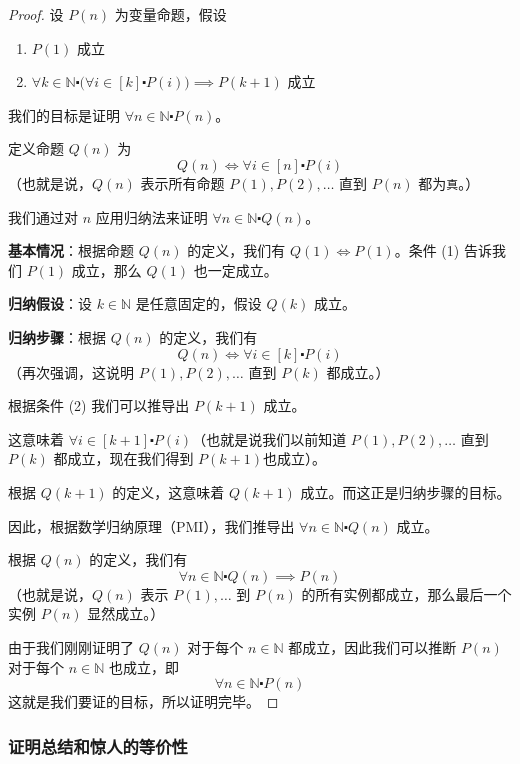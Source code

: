 \begin{proof}
    设 $P(n)$ 为变量命题，假设
    \begin{enumerate}[label=(\arabic*)]
        \item $P(1)$ 成立
        \item $\forall k \in \mathbb{N} \centerdot \big(\forall i \in [k] \centerdot P(i)\big) \implies P(k+1)$ 成立
    \end{enumerate}
    我们的目标是证明 $\forall n \in \mathbb{N} \centerdot P(n)$。

    定义命题 $Q(n)$ 为
    \[Q(n) \iff \forall i \in [n] \centerdot P(i)\]
    （也就是说，$Q(n)$ 表示所有命题 $P(1), P(2), \dots$ 直到 $P(n)$ 都为\verb|真|。）

    我们通过对 $n$ 应用归纳法来证明 $\forall n \in \mathbb{N} \centerdot Q(n)$。

    \textbf{基本情况}：根据命题 $Q(n)$ 的定义，我们有 $Q(1) \iff P(1)$。条件 (1) 告诉我们 $P(1)$ 成立，那么 $Q(1)$ 也一定成立。

    \textbf{归纳假设}：设 $k \in \mathbb{N}$ 是任意固定的，假设 $Q(k)$ 成立。

    \textbf{归纳步骤}：根据 $Q(n)$ 的定义，我们有
    \[Q(n) \iff \forall i \in [k] \centerdot P(i)\]
    （再次强调，这说明 $P(1), P(2), \dots$ 直到 $P(k)$ 都成立。）

    根据条件 (2) 我们可以推导出 $P(k+1)$ 成立。

    这意味着 $\forall i \in [k+1] \centerdot P(i)$（也就是说我们以前知道 $P(1), P(2), \dots$ 直到 $P(k)$ 都成立，现在我们得到 $P(k+1) 也成立$）。

    根据 $Q(k+1)$ 的定义，这意味着 $Q(k+1)$ 成立。而这正是归纳步骤的目标。

    因此，根据数学归纳原理（PMI），我们推导出 $\forall n \in \mathbb{N} \centerdot Q(n)$ 成立。

    根据 $Q(n)$ 的定义，我们有
    \[\forall n \in \mathbb{N} \centerdot Q(n) \implies P(n)\]
    （也就是说，$Q(n)$ 表示 $P(1), \dots$ 到 $P(n)$ 的所有实例都成立，那么最后一个实例 $P(n)$ 显然成立。）

    由于我们刚刚证明了 $Q(n)$ 对于每个 $n \in \mathbb{N}$ 都成立，因此我们可以推断 $P(n)$ 对于每个 $n \in \mathbb{N}$ 也成立，即
    \[\forall n \in \mathbb{N} \centerdot P(n)\]
    这就是我们要证的目标，所以证明完毕。
\end{proof}

\subsubsection*{证明总结和惊人的等价性}

